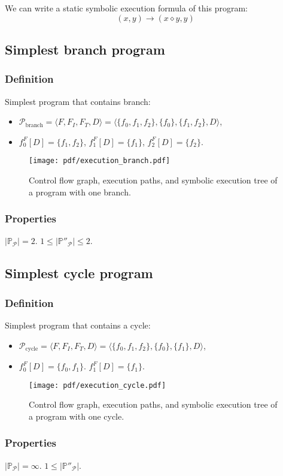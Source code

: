 \documentclass[fleqn,oneside,a4]{article}
\newcommand{\sublevel}{\subsection}
\newcommand{\subsublevel}{\subsubsection}
\newcommand{\ra}{\rightarrow}
\begin{document}
We can write a static symbolic execution formula of this program:
\[(x, y) \ra (x \diamond y, y)\]

\sublevel{Simplest branch program}

\subsublevel*{Definition}

Simplest program that contains branch:
\begin{itemize}
    \item $\mathcal{P}_{\text{branch}} = \langle F, F_I, F_T, D \rangle =
        \langle \{f_0, f_1, f_2\}, \{f_0\}, \{f_1, f_2\}, D \rangle$,
    \item $f_0^F[D] = \{f_1, f_2\}$,
        $f_1^F[D] = \{f_1\}$, $f_2^F[D] = \{f_2\}$.
\end{itemize}

\begin{figure}[h!]
    \begin{center}
        \texttt{[image: pdf/execution\_branch.pdf]}
    \end{center}
    \caption{Control flow graph, execution paths,
        and symbolic execution tree of a program with one branch.}
\end{figure}

\subsublevel*{Properties}

$|\mathds{P}_\mathcal{P}| = 2$.
$1 \le |\mathds{P}''_\mathcal{P}| \le 2$.

\sublevel{Simplest cycle program}

\subsublevel*{Definition}

Simplest program that contains a cycle:
\begin{itemize}
    \item $\mathcal{P}_{\text{cycle}} = \langle F, F_I, F_T, D \rangle =
        \langle \{f_0, f_1, f_2\}, \{f_0\}, \{f_1\}, D \rangle$,
    \item $f_0^F[D] = \{f_0, f_1\}$. $f_1^F[D] = \{f_1\}$.
\end{itemize}

\begin{figure}[h!]
    \begin{center}
        \texttt{[image: pdf/execution\_cycle.pdf]}
    \end{center}
    \caption{Control flow graph, execution paths,
        and symbolic execution tree of a program with one cycle.}
\end{figure}

\subsublevel*{Properties}

$|\mathds{P}_\mathcal{P}| = \infty$.
$1 \le |\mathds{P}''_\mathcal{P}|$.
\end{document}
